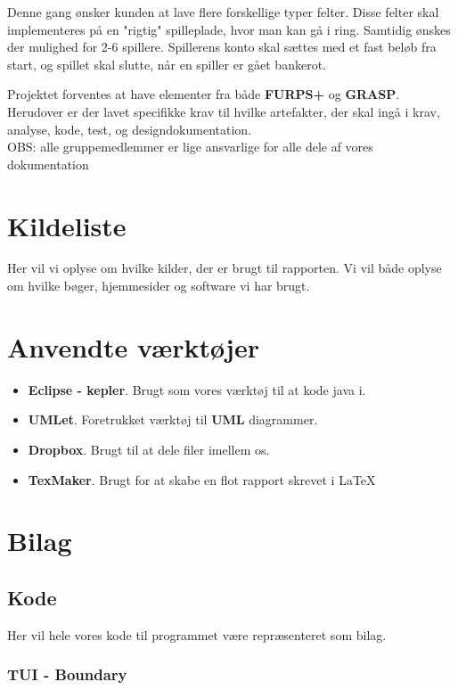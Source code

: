 \documentclass{article}
\begin{document}
Denne gang ønsker kunden at lave flere forskellige typer felter. Disse felter skal implementeres på en "rigtig" spilleplade, hvor man kan gå i ring. Samtidig ønskes der mulighed for 2-6 spillere. Spillerens konto skal sættes med et fast beløb fra start, og spillet skal slutte, når en spiller er gået bankerot.


Projektet forventes at have elementer fra både \textbf{FURPS+} og \textbf{GRASP}. Herudover er der lavet specifikke krav til hvilke artefakter, der skal ingå i krav, analyse, kode, test, og designdokumentation.
\\

OBS: alle gruppemedlemmer er lige ansvarlige for alle dele af vores dokumentation










\section{Kildeliste}
Her vil vi oplyse om hvilke kilder, der er brugt til rapporten.
Vi vil både oplyse om hvilke bøger, hjemmesider og software vi har brugt.
\printbibliography %
\section{Anvendte værktøjer}
\begin{itemize}
\item \textbf{Eclipse - kepler}. Brugt som vores værktøj til at kode java i.
\item \textbf{UMLet}. Foretrukket værktøj til \textbf{UML} diagrammer.
\item \textbf{Dropbox}. Brugt til at dele filer imellem os. 
\item \textbf{TexMaker}. Brugt for at skabe en flot rapport skrevet i \LaTeX
\end{itemize}
\newpage
\section{Bilag}
\subsection{Kode}
Her vil hele vores kode til programmet være repræsenteret som bilag.
\subsubsection{TUI - Boundary}

\end{document}
